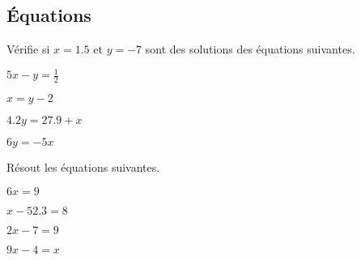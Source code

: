 \subsection{Équations}

\begin{exercice}
    Vérifie si $x = 1.5$ et $y = -7$ sont des solutions des équations suivantes.
    \begin{exerciceenumnoeq}
        \item $5x - y = \frac12$
        \item $x = y -2$
        \item $4.2y = 27.9 + x$
        \item $6y = -5x$
    \end{exerciceenumnoeq}
\end{exercice}

\begin{exercice}
    Résout les équations suivantes.
    \begin{exerciceenumnoeq}
        \item $6x = 9$
        \item $x - 52.3 = 8$
        \item $2x - 7 = 9$
        \item $9x - 4 = x$
    \end{exerciceenumnoeq}
\end{exercice}